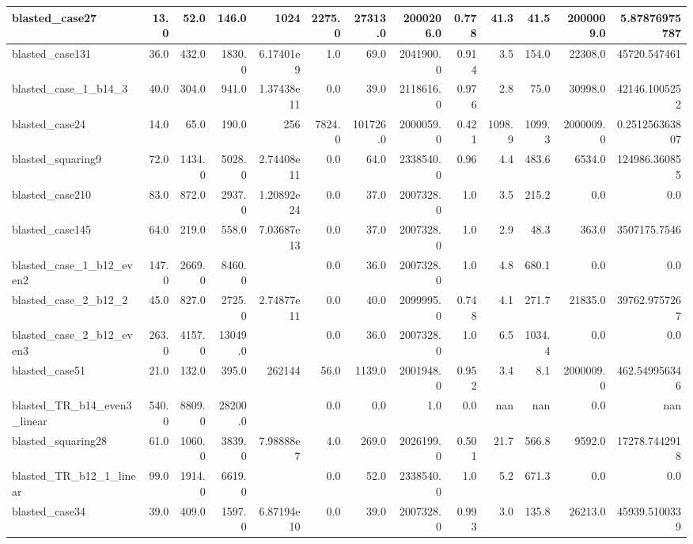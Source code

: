 \begin{tabular}{|l r r r r| r r r r r r | r r|}
\hline
blasted\_case27 & 13.0 & 52.0 & 146.0 & 1024 & 2275.0 & 27313.0 & 2000206.0 & 0.778 & 41.3 & 41.5 & 2000009.0 & 5.87876975787 \\
\hline
blasted\_case131 & 36.0 & 432.0 & 1830.0 & 6.17401e9 & 1.0 & 69.0 & 2041900.0 & 0.914 & 3.5 & 154.0 & 22308.0 & 45720.547461 \\
\hline
blasted\_case\_1\_b14\_3 & 40.0 & 304.0 & 941.0 & 1.37438e11 & 0.0 & 39.0 & 2118616.0 & 0.976 & 2.8 & 75.0 & 30998.0 & 42146.1005252 \\
\hline
blasted\_case24 & 14.0 & 65.0 & 190.0 & 256 & 7824.0 & 101726.0 & 2000059.0 & 0.421 & 1098.9 & 1099.3 & 2000009.0 & 0.251256363807 \\
\hline
blasted\_squaring9 & 72.0 & 1434.0 & 5028.0 & 2.74408e11 & 0.0 & 64.0 & 2338540.0 & 0.96 & 4.4 & 483.6 & 6534.0 & 124986.360855 \\
\hline
blasted\_case210 & 83.0 & 872.0 & 2937.0 & 1.20892e24 & 0.0 & 37.0 & 2007328.0 & 1.0 & 3.5 & 215.2 & 0.0 & 0.0 \\
\hline
blasted\_case145 & 64.0 & 219.0 & 558.0 & 7.03687e13 & 0.0 & 37.0 & 2007328.0 & 1.0 & 2.9 & 48.3 & 363.0 & 3507175.7546 \\
\hline
blasted\_case\_1\_b12\_even2 & 147.0 & 2669.0 & 8460.0 &  & 0.0 & 36.0 & 2007328.0 & 1.0 & 4.8 & 680.1 & 0.0 & 0.0 \\
\hline
blasted\_case\_2\_b12\_2 & 45.0 & 827.0 & 2725.0 & 2.74877e11 & 0.0 & 40.0 & 2099995.0 & 0.748 & 4.1 & 271.7 & 21835.0 & 39762.9757267 \\
\hline
blasted\_case\_2\_b12\_even3 & 263.0 & 4157.0 & 13049.0 &  & 0.0 & 36.0 & 2007328.0 & 1.0 & 6.5 & 1034.4 & 0.0 & 0.0 \\
\hline
blasted\_case51 & 21.0 & 132.0 & 395.0 & 262144 & 56.0 & 1139.0 & 2001948.0 & 0.952 & 3.4 & 8.1 & 2000009.0 & 462.549956346 \\
\hline
blasted\_TR\_b14\_even3\_linear & 540.0 & 8809.0 & 28200.0 &  & 0.0 & 0.0 & 1.0 & 0.0 & nan & nan & 0.0 & nan \\
\hline
blasted\_squaring28 & 61.0 & 1060.0 & 3839.0 & 7.98888e7 & 4.0 & 269.0 & 2026199.0 & 0.501 & 21.7 & 566.8 & 9592.0 & 17278.7442918 \\
\hline
blasted\_TR\_b12\_1\_linear & 99.0 & 1914.0 & 6619.0 &  & 0.0 & 52.0 & 2338540.0 & 1.0 & 5.2 & 671.3 & 0.0 & 0.0 \\
\hline
blasted\_case34 & 39.0 & 409.0 & 1597.0 & 6.87194e10 & 0.0 & 39.0 & 2007328.0 & 0.993 & 3.0 & 135.8 & 26213.0 & 45939.5100339 \\
\hline

\end{tabular}
